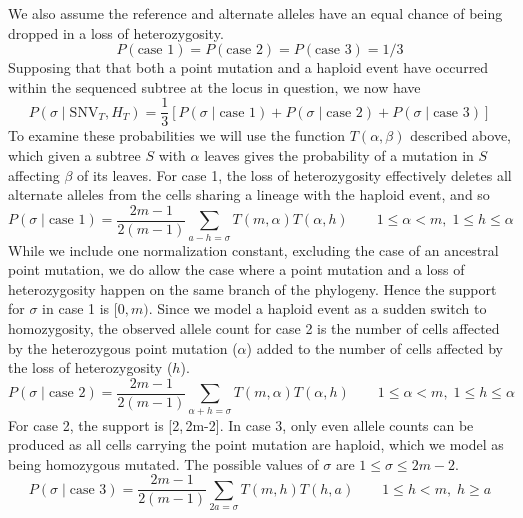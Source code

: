 \documentclass[../../main.tex]{subfiles}
\begin{document}
We also assume the reference and alternate alleles have an equal chance of being dropped in a loss of heterozygosity.
\begin{equation*}
P(\text{case 1})=P(\text{case 2}) = P(\text{case 3}) = 1/3
\end{equation*}
Supposing that that both a point mutation and a haploid event have occurred within the sequenced subtree at the locus in question, we now have
\begin{equation*}
P(\sigma\mid\text{SNV}_T,H_T)=\frac{1}{3}\left[P(\sigma\mid\text{case 1})+P(\sigma\mid\text{case 2})+P(\sigma\mid\text{case 3})\right]
\end{equation*}
To examine these probabilities we will use the function $T(\alpha,\beta)$ described above, which given a subtree $S$ with $\alpha$ leaves gives the probability of a mutation in $S$ affecting $\beta$ of its leaves.
For case 1, the loss of heterozygosity effectively deletes all alternate alleles from the cells sharing a lineage with the haploid event, and so
\begin{equation*}
P(\sigma\mid\text{case 1}) = \frac{2m-1}{2(m-1)}\sum_{a-h=\sigma}T(m,\alpha)T(\alpha,h)\qquad 1\leq \alpha < m,\;1\leq h\leq\alpha 
\end{equation*}
While we include one normalization constant, excluding the case of an ancestral point mutation, we do allow the case where a point mutation and a loss of heterozygosity happen on the same branch of the phylogeny.
Hence the support for $\sigma$ in case 1 is $[0,m)$.
Since we model a haploid event as a sudden switch to homozygosity, the observed allele count for case 2 is the number of cells affected by the heterozygous point mutation ($\alpha$) added to the number of cells affected by the loss of heterozygosity ($h$).
\begin{equation*}
P(\sigma\mid\text{case 2}) = \frac{2m-1}{2(m-1)}\sum_{\alpha+h=\sigma}T(m,\alpha)T(\alpha,h) \qquad 1\leq \alpha < m,\;1\leq h\leq\alpha 
\end{equation*}
For case 2, the support is [2,\,2m-2].
In case 3, only even allele counts can be produced as all cells carrying the point mutation are haploid, which we model as being homozygous mutated.
The possible values of $\sigma$ are $1\leq\sigma\leq 2m-2$.
\begin{equation*}
P(\sigma\mid\text{case 3}) = \frac{2m-1}{2(m-1)}\sum_{2a=\sigma} T(m,h)T(h,a) \qquad 1\leq h < m,\; h\geq a
\end{equation*}
\end{document}
